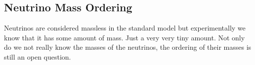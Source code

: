 \subsection{Neutrino Mass Ordering}

Neutrinos are considered massless in the standard model but experimentally we know that it has some amount of mass.
Just a very very tiny amount.
Not only do we not really know the masses of the neutrinos, the ordering of their masses is still an open question.